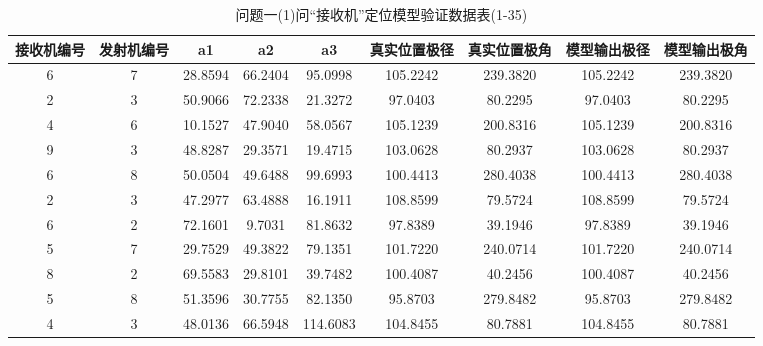 \documentclass[withoutpreface,bwprint]{cumcmthesis}
\begin{document}
\begin{appendices}
		\begin{table}[htbp!]
			\caption{问题一(1)问“接收机”定位模型验证数据表(1-35)}
			\footnotesize
			\centering
			\begin{tabular}{@{}ccccccccc@{}}
				\toprule
				\textbf{接收机编号} & \textbf{发射机编号} & \textbf{a1} & \textbf{a2} & \textbf{a3} & \textbf{真实位置极径} & \textbf{真实位置极角} & \textbf{模型输出极径} & \textbf{模型输出极角} \\ \midrule
				6              & 7              & 28.8594     & 66.2404     & 95.0998     & 105.2242        & 239.3820        & 105.2242        & 239.3820        \\
				2              & 3              & 50.9066     & 72.2338     & 21.3272     & 97.0403         & 80.2295         & 97.0403         & 80.2295         \\
				4              & 6              & 10.1527     & 47.9040     & 58.0567     & 105.1239        & 200.8316        & 105.1239        & 200.8316        \\
				9              & 3              & 48.8287     & 29.3571     & 19.4715     & 103.0628        & 80.2937         & 103.0628        & 80.2937         \\
				6              & 8              & 50.0504     & 49.6488     & 99.6993     & 100.4413        & 280.4038        & 100.4413        & 280.4038        \\
				2              & 3              & 47.2977     & 63.4888     & 16.1911     & 108.8599        & 79.5724         & 108.8599        & 79.5724         \\
				6              & 2              & 72.1601     & 9.7031      & 81.8632     & 97.8389         & 39.1946         & 97.8389         & 39.1946         \\
				5              & 7              & 29.7529     & 49.3822     & 79.1351     & 101.7220        & 240.0714        & 101.7220        & 240.0714        \\
				8              & 2              & 69.5583     & 29.8101     & 39.7482     & 100.4087        & 40.2456         & 100.4087        & 40.2456         \\
				5              & 8              & 51.3596     & 30.7755     & 82.1350     & 95.8703         & 279.8482        & 95.8703         & 279.8482        \\
				4              & 3              & 48.0136     & 66.5948     & 114.6083    & 104.8455        & 80.7881         & 104.8455        & 80.7881         \\

\end{tabular}
\end{table}
\end{appendices}
\end{document}
